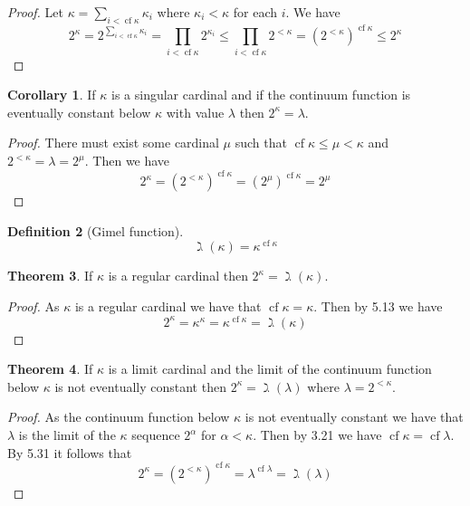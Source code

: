 \documentclass{article}
\theoremstyle{definition}
\newtheorem{thm}{Theorem}[section]
\newtheorem{crly}[thm]{Corollary}
\newtheorem{defn}[thm]{Definition}
\DeclareMathOperator{\cf}{cf}
\begin{document}
\begin{proof}
    Let $\kappa = \sum_{i < \cf \kappa} \kappa_i$ where $\kappa_i < \kappa$ for each $i$. We have 
    \[
        2^{\kappa} = 2^{\sum_{i < \cf \kappa} \kappa_i} = \prod_{i < \cf \kappa} 2^{\kappa_i} \le \prod_{i < \cf \kappa} 2^{< \kappa} = (2^{< \kappa})^{\cf \kappa} \le 2^{\kappa}
    \]
\end{proof}

\begin{crly}
    If $\kappa$ is a singular cardinal and if the continuum function is eventually constant below $\kappa$ with value $\lambda$ then $2^\kappa = \lambda$.
\end{crly}

\begin{proof}
    There must exist some cardinal $\mu$ such that $\cf \kappa \le \mu < \kappa$ and $2^{< \kappa} = \lambda = 2^{\mu}$. Then we have 
    \[
        2^{\kappa} = (2^{< \kappa})^{\cf \kappa} = (2^{\mu})^{\cf \kappa} = 2^\mu
    \]
\end{proof}

\newpage

\begin{defn}[Gimel function]
    \[
        \gimel(\kappa) = \kappa^{\cf \kappa}
    \]
\end{defn}

\begin{thm}
    If $\kappa$ is a regular cardinal then $2^\kappa = \gimel(\kappa)$. 
\end{thm}

\begin{proof}
    As $\kappa$ is a regular cardinal we have that $\cf \kappa = \kappa$. Then by 5.13 we have 
    \[
        2^\kappa = \kappa^\kappa = \kappa^{\cf \kappa} = \gimel(\kappa)
    \]
\end{proof}

\begin{thm}
    If $\kappa$ is a limit cardinal and the limit of the continuum function below $\kappa$ is not eventually constant then $2^{\kappa} = \gimel(\lambda)$ where $\lambda = 2^{< \kappa}$.
\end{thm}

\begin{proof}
    As the continuum function below $\kappa$ is not eventually constant we have that $\lambda$ is the limit of the $\kappa$ sequence $2^{\alpha}$ for $\alpha < \kappa$. Then by 3.21 we have $\cf \kappa = \cf \lambda$. By 5.31 it follows that 
    \[
        2^\kappa = (2^{< \kappa})^{\cf \kappa} = \lambda^{\cf \lambda} = \gimel(\lambda)
    \]
\end{proof}
\end{document}
